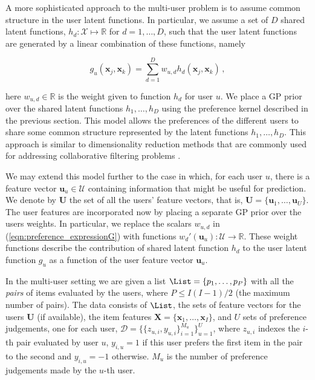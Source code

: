 A more sophisticated approach to the multi-user problem is to assume common structure in the user latent functions. In particular, we assume a set of $D$ shared latent functions, $h_d:\mathcal{X} \mapsto \mathbb{R}$ for $d=1,\ldots,D$, such that the user latent functions are  generated by a linear combination of these functions, namely

\begin{equation}
	g_{u}(\mathbf{x}_j,\mathbf{x}_k)=\sum_{d=1}^{D}w_{u,d}h_{d}(\mathbf{x}_j,\mathbf{x}_k)\,,\label{eqn:preference_expressionG}
\end{equation}

here $w_{u,d}\in \mathbb{R}$ is the weight given to function $h_d$ for user $u$. We place a GP prior over the shared latent functions $h_{1},\ldots,h_{D}$ using the preference kernel described in the previous section. This model allows the preferences of the different users to share some common structure represented by the latent functions $h_{1},\ldots,h_{D}$. This approach is similar to dimensionality reduction methods that are commonly used for addressing collaborative filtering problems \citep{Stern2009,raiko2007}.

We may extend this model further to the case in which, for each user $u$, there is a feature vector $\mathbf{u}_u \in \mathcal{U}$ containing information that might be useful for prediction. We denote by $\mathbf{U}$ the set of all the users' feature vectors, that is, $\mathbf{U} = \{\mathbf{u}_1,\ldots,\mathbf{u}_U\}$. The user features are incorporated now by placing a separate GP prior over the users weights. In particular, we replace the scalars $w_{u,d}$ in (\ref{eqn:preference_expressionG}) with functions $w_d'(\mathbf{u}_u):\mathcal{U}\rightarrow\mathcal{\mathbb{R}}$.  These weight functions describe the contribution of shared latent function $h_d$ to the user latent function $g_u$ as a function of the user feature vector $\mathbf{u}_u$.

In the multi-user setting we are given a list
$\List=\{p_1,\ldots,p_P\}$ with all the \emph{pairs} of items evaluated by the users, where $P\leq I(I-1)/2$ (the maximum number of pairs). The data consists of $\List$, the sets of feature vectors for the users $\mathbf{U}$ (if available), the item features $\mathbf{X}=\{\mathbf{x}_1,\ldots,\mathbf{x}_I\}$, and $U$ sets of preference judgements, one for each user, $\mathcal{D}=\{\{z_{u,i},y_{u,i}\}_{i=1}^{M_u}\}_{u=1}^{U}$, where $z_{u,i}$ indexes the $i$-th pair evaluated by user $u$, $y_{i,u}=1$ if this user prefers the first item in the pair to the second and $y_{i,u}=-1$ otherwise. $M_u$ is the number of  preference judgements made by the $u$-th user.

